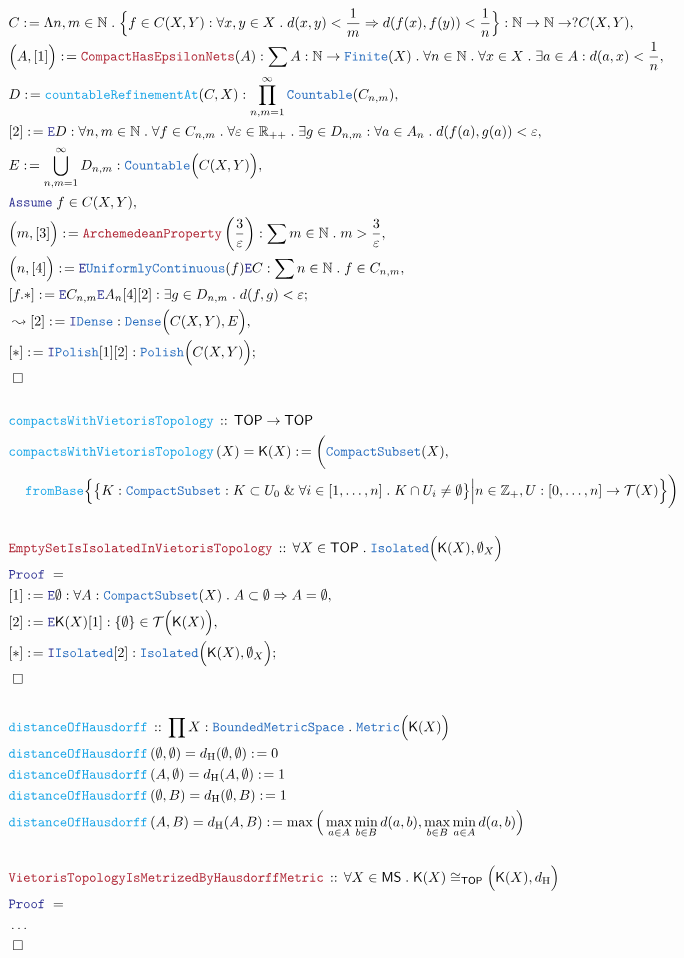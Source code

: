 \documentclass[12pt]{scrartcl}
\newcommand{\TYPE}[1]{\textcolor{NavyBlue}{\mathtt{#1}}}
\newcommand{\FUNC}[1]{\textcolor{Cerulean}{\mathtt{#1}}}
\newcommand{\LOGIC}[1]{\textcolor{Blue}{\mathtt{#1}}}
\newcommand{\THM}[1]{\textcolor{Maroon}{\mathtt{#1}}}
\renewcommand{\.}{\; . \;}
\newcommand{\de}{: \kern 0.1pc =}
\newcommand{\Act}[1]{\left( #1 \right)}
\newcommand{\Theorem}[2]{& \THM{#1} \, :: \, #2 \\ & \Proof = \\ }
\newcommand{\DeclareFunc}[2]{& \FUNC{#1} \, :: \, #2 \\}
\newcommand{\DefineNamedFunc}[4]{&  \FUNC{#1}\Act{#2} = #3 \de #4 \\}
\newcommand{\NewLine}{\\ & \kern 1pc}
\newcommand{\Page}[1]{ \begin{align*} #1 \end{align*}   }
\newcommand{\NoProof}{ & \ldots \\ \EndProof}
\renewcommand{\And}{\; \& \;}
\newcommand{\Imply}{\Rightarrow}
\newcommand{\Intro}{\LOGIC{I}}
\newcommand{\Elim}{\LOGIC{E}}
\newcommand{\Int}{\mathbb{Z} }
\newcommand{\Reals}{\mathbb{R} }
\newcommand{\Nat}{\mathbb{N} }
\newcommand{\Say}[3]{& #1 \de #2 : #3, \\}
\newcommand{\Conclude}[3]{& #1 \de #2 : #3; \\}
\newcommand{\Derive}[3]{& \leadsto #1 \de #2 : #3, \\}
\newcommand{\AssumeIn}[2]{& \LOGIC{Assume} \; #1 \in #2, \\}
\newcommand{\QED}{\; \square}
\newcommand{\EndProof}{& \QED \\}
\newcommand{\Proof}{\LOGIC{Proof} \; }
\newcommand{\Compacts}{\TYPE{CompactSubset}}
\newcommand{\TOP}{\mathsf{TOP}}
\newcommand{\T}{\mathcal{T}}
\newcommand{\MS}{\mathsf{MS}}
\newcommand{\K}{\mathsf{K}}
\begin{document}
\Page{
	\Say{C}{
		\Lambda n,m \in \Nat \. 
		\Big\{f \in C(X,Y) : \forall x,y \in X \. d(x,y) < \frac{1}{m} \Imply d(f(x),f(y)) < \frac{1}{n} \Big\} 
	}{ \Nat \to \Nat \to ?C(X,Y)  }
	\Say{\Big(A,[1]\Big)}
	{
		\THM{CompactHasEpsilonNets}(A)
	}
	{
		\sum A : \Nat \to \TYPE{Finite}(X) \.
		\forall n \in \Nat \.
		\forall x \in X \.
		\exists a \in A :
		d(a,x) < \frac{1}{n}
	}
	\Say{D}{\FUNC{countableRefinementAt}(C,X)}
	{
		\prod^\infty_{n,m=1} \TYPE{Countable}(C_{n,m})
	}
	\Say{[2]}{\Elim D}
	{
		\forall n,m \in \Nat \.
		\forall f \in C_{n,m} \.
		\forall \varepsilon \in \Reals_{++} \.
		\exists g \in D_{n,m} :
		\forall a \in A_n \.
		d( f(a),g(a) ) < \varepsilon
	}
	\Say{E}{\bigcup^\infty_{n,m=1} D_{n,m}}{\TYPE{Countable}\Big(C(X,Y)\Big)}
	\AssumeIn{f}{C(X,Y)}
	\Say{\Big(m,[3]\Big)}{\THM{ArchemedeanProperty}\left(\frac{3}{\varepsilon}\right)}
	{
		\sum m \in \Nat \. m > \frac{3}{\varepsilon}
	}
	\Say{\Big(n,[4]\Big)}{\Elim \TYPE{UniformlyContinuous}(f)\Elim C}
	{
		\sum n \in \Nat \. f \in C_{n,m}
	}
	\Conclude{[f.*]}{\Elim C_{n,m} \Elim A_n [4][2]}
	{
		\exists g \in D_{n,m} \. d(f,g) < \varepsilon
	}
	\Derive{[2]}{\Intro \TYPE{Dense}}{\TYPE{Dense}\Big( C(X,Y), E\Big)}
	\Conclude{[*]}{\Intro \TYPE{Polish}[1][2]}{\TYPE{Polish}\Big( C(X,Y)\Big)}
	\EndProof
	\\
	\DeclareFunc{compactsWithVietorisTopology}
	{
		\TOP \to \TOP
	}
	\DefineNamedFunc{compactsWithVietorisTopology}
	{X}{\K(X)}
	{
		\bigg(
				\Compacts(X), \NewLine 
				\FUNC{fromBase}\Big\{
					\big\{ 
						K : \Compacts :
						K \subset U_0 \And 
						\forall i \in [1,\ldots,n] \.
						K \cap U_i \neq \emptyset
					\big\}
					\Big|
					n \in \Int_+,
					U : [0,\ldots,n] \to \T(X)
				\Big\}
		\bigg)
	}
	\\
	\Theorem{EmptySetIsIsolatedInVietorisTopology}
	{
		\forall X \in \TOP \.
		\TYPE{Isolated}\Big( \K(X), \emptyset_X\Big)
	}
	\Say{[1]}{\Elim \emptyset}{\forall A : \Compacts(X) \.  A \subset \emptyset \Imply A = \emptyset}
	\Say{[2]}{\Elim \K(X)[1]}{ \{\emptyset\} \in \T\Big(\K(X)\Big)  }
	\Conclude{[*]}{\Intro \TYPE{Isolated}[2]}{\TYPE{Isolated}\Big( \K(X),\emptyset_X\Big)}
	\EndProof
	\\
	\DeclareFunc{distanceOfHausdorff}
	{
		\prod X : \TYPE{BoundedMetricSpace} \.
		\TYPE{Metric}\Big( \K(X) \Big)
	}
	\DefineNamedFunc{distanceOfHausdorff}{\emptyset,\emptyset}{d_{\mathrm{H}}(\emptyset,\emptyset)}{0}
	\DefineNamedFunc{distanceOfHausdorff}{A,\emptyset}{d_{\mathrm{H}}(A,\emptyset)}{1}
	\DefineNamedFunc{distanceOfHausdorff}{\emptyset,B}{d_{\mathrm{H}}(\emptyset,B)}{1}
	\DefineNamedFunc{distanceOfHausdorff}{A,B}{d_{\mathrm{H}}(A,B)}
	{
		\max\Big( \max_{a \in A} \min_{b \in B} d(a,b), \max_{b \in B} \min_{a \in A} d(a,b)\Big)
	}
	\\
	\Theorem{VietorisTopologyIsMetrizedByHausdorffMetric}
	{
		\forall X \in \MS \. \K(X) \cong_\TOP \Big( \K(X),d_{\mathrm{H}} \Big)
	}
	\NoProof
}
\end{document}

